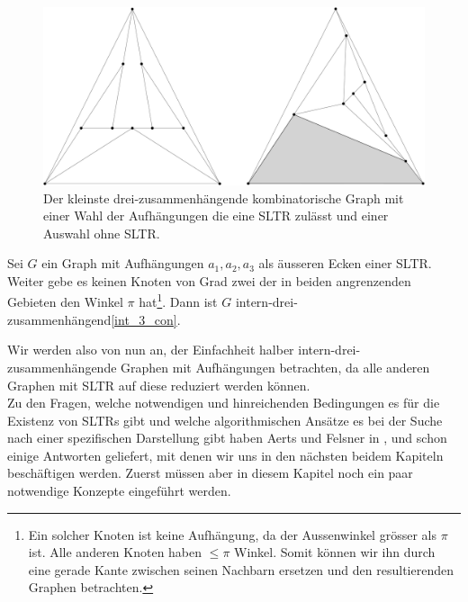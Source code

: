 \begin{figure}
	\centering
  \includegraphics[scale=0.1]{10_example.png}
	\caption{Der kleinste drei-zusammenhängende kombinatorische Graph mit einer Wahl der Aufhängungen die eine SLTR zulässt und einer Auswahl ohne SLTR.}
	\label{10_example}
\end{figure}

\begin{proposition}
Sei $G$ ein Graph mit Aufhängungen $a_1,a_2,a_3$ als äusseren Ecken einer SLTR. Weiter gebe es keinen Knoten von Grad zwei der in beiden angrenzenden Gebieten den Winkel $\pi$ hat\footnote{Ein solcher Knoten ist keine Aufhängung, da der Aussenwinkel grösser als $\pi$ ist. Alle anderen Knoten haben $\leq\pi$ Winkel. Somit können wir ihn durch eine gerade Kante zwischen seinen Nachbarn ersetzen und den resultierenden Graphen betrachten.}. Dann ist $G$ intern-drei-zusammenhängend\ref{int_3_con}.
\end{proposition}


Wir werden also von nun an, der Einfachheit halber intern-drei-zusammenhängende Graphen mit Aufhängungen betrachten, da alle anderen Graphen mit SLTR auf diese reduziert werden können. \\

Zu den Fragen, welche notwendigen und hinreichenden Bedingungen es für die Existenz von SLTRs gibt und  welche algorithmischen Ansätze es bei der Suche nach einer spezifischen Darstellung gibt haben Aerts und Felsner in \cite{af13}, \cite{af13h} und \cite{af15} schon einige Antworten geliefert, mit denen wir uns in den nächsten beidem Kapiteln beschäftigen werden. Zuerst müssen aber in diesem Kapitel noch ein paar notwendige Konzepte eingeführt werden.
